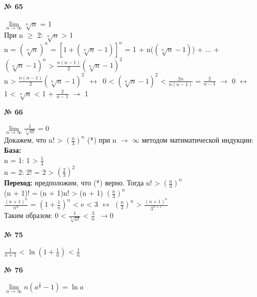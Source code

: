 \documentclass[12pt]{article}
\begin{document}
	\vspace{1cm}
	{
	{\textbf{№ 65}\\ \par}
	{\large $\lim\limits_{n \to \infty}\sqrt[n]{n}$ = 1\\}
	При n $\geq$ 2: $\sqrt[n]{n}$ > 1\\
	n = $(\sqrt[n]{n})^n$ = $[1 + (\sqrt[n]{n}-1)]^n$ = 1 + n($(\sqrt[n]{n}-1)$) + ... + $(\sqrt[n]{n}-1)^n$ > $\frac{n(n-1)}{2}(\sqrt[n]{n}-1)^2$ \\
	n > $\frac{n(n-1)}{2}(\sqrt[n]{n}-1)^2 \enspace \leftrightarrow \enspace 0$ < $(\sqrt[n]{n}-1)^2$ < $\frac{2n}{n(n-1)}$ = $\frac{2}{n-1}$ $\to$ 0 $\leftrightarrow$ \\
	1 < $\sqrt[n]{n}$ < 1 + $\frac{2}{n-1}$ $\to$ 1\\
	
	}

	\vspace{1.5cm}
{
	{\textbf{№ 66}\\ \par}
	{\large $\lim\limits_{n \to \infty}\frac{1}{\sqrt[n]{n!}} = 0$\\}
	Докажем, что n! > $(\frac{n}{3})^n$ (*) при n $\to$ $\infty$ методом матиматической индукции:\\
	\textbf{База:\\}
	n = 1: 1 > $\frac{1}{3}$\\
	n = 2: 2! = 2 > $(\frac{2}{3})^2$\\
	\textbf{Переход: }нредположим, что (*) верно. Тогда n! > $(\frac{n}{3})^n$\\
	(n + 1)! = (n + 1)n! > (n + 1) $(\frac{n}{3})^n$\\
	$\frac{(n+1)^n}{n^n}$ = $(1 + \frac{1}{n})^n$ < e < 3 $\leftrightarrow$ $(\frac{n}{3})^n$ > 
	$\frac{(n+1)^n}{3^{n+1}}$\\
	Таким образом: 0 < $\frac{1}{\sqrt[n]{n!}}$ < $\frac{3}{n} \enspace \to 0$\\
}

	\vspace{1cm}
{
	{\textbf{№ 75}\\ \par}
	$\frac{1}{n+1}$ < $\ln (1+\frac{1}{n})$ < $\frac{1}{n}$\\

}

	\vspace{1cm}
{
	{\textbf{№ 76}\\ \par}
	$\lim\limits_{n \to \infty}n(a^{\frac{1}{n}}-1)=\ln a$
	
}
\end{document}
